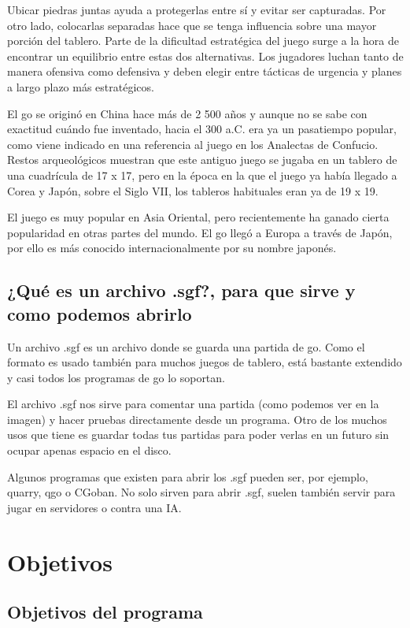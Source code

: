 \documentclass[12pt,a4paper]{report}
\begin{document}
Ubicar piedras juntas ayuda a protegerlas entre sí y evitar ser capturadas. Por
otro lado, colocarlas separadas hace que se tenga influencia sobre una mayor
porción del tablero. Parte de la dificultad estratégica del juego surge a la
hora de encontrar un equilibrio entre estas dos alternativas. Los jugadores
luchan tanto de manera ofensiva como defensiva y deben elegir entre tácticas de
urgencia y planes a largo plazo más estratégicos.

El go se originó en China hace más de 2 500 años y aunque no se sabe con
exactitud cuándo fue inventado, hacia el 300 a.C. era ya un pasatiempo popular,
como viene indicado en una referencia al juego en los Analectas de Confucio.
Restos arqueológicos muestran que este antiguo juego se jugaba en un tablero de
una cuadrícula de 17 x 17, pero en la época en la que el juego ya había llegado
a Corea y Japón, sobre el Siglo VII, los tableros habituales eran ya de 19 x 19.

El juego es muy popular en Asia Oriental, pero recientemente ha ganado cierta
popularidad en otras partes del mundo. El go llegó a Europa a través de Japón,
por ello es más conocido internacionalmente por su nombre japonés.


\section{¿Qué es un archivo .sgf?, para que sirve y como podemos abrirlo}
\label{sgf} Un archivo .sgf es un archivo donde se guarda una partida de
go. Como el formato es usado también para muchos juegos de tablero, está
bastante extendido y casi todos los programas de go lo soportan.

El archivo .sgf nos sirve para comentar una partida (como podemos ver en la
imagen) y hacer pruebas directamente desde un programa. Otro de los muchos
usos que tiene es guardar todas tus partidas para poder verlas en un futuro sin
ocupar apenas espacio en el disco. %

Algunos programas que existen para abrir los .sgf pueden ser, por ejemplo,
quarry, qgo o CGoban. No solo sirven para abrir .sgf, suelen también servir para
jugar en servidores o contra una IA. %


\chapter{Objetivos} 

\section{Objetivos del programa} 
\end{document}
